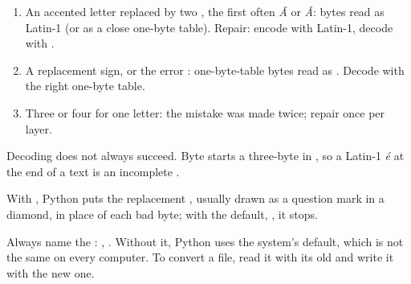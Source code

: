 \begin{method}\label{met:g10:text-encodings:recognise}
\begin{enumerate}
  \item An accented letter replaced by two , the first often \textit{Ã} or \textit{Â}:  bytes read as
    Latin-1 (or as a close one-byte table). Repair: encode with Latin-1, decode with .
  \item A replacement sign, or the error : one-byte-table bytes read as . Decode with the
    right one-byte table.
  \item Three or four  for one letter: the mistake was made twice; repair once per layer.
\end{enumerate}
\end{method}

Decoding does not always succeed. Byte  starts a three-byte  in , so a Latin-1 \textit{é} at
the end of a text is an incomplete  .

\label{lst:g10:text-encodings:decode-error}

\label{out:g10:text-encodings:decode-error}

With , Python puts the replacement  , usually drawn as a question mark
in a diamond, in place of each bad byte; with the default, , it stops.

\begin{method}\label{met:g10:text-encodings:files}
Always name the : , . Without
it, Python uses the system's default, which is not the same on every computer. To convert a file, read it with its
old  and write it with the new one.
\end{method}

